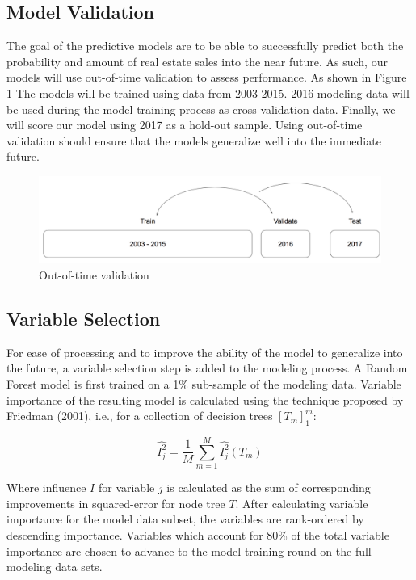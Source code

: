 \documentclass[12pt,]{article}
\begin{document}
\hypertarget{model-validation}{%
\subsection{Model Validation}\label{model-validation}}

The goal of the predictive models are to be able to successfully predict
both the probability and amount of real estate sales into the near
future. As such, our models will use out-of-time validation to assess
performance. As shown in Figure \ref{fig:Train Test Validate} The models
will be trained using data from 2003-2015. 2016 modeling data will be
used during the model training process as cross-validation data.
Finally, we will score our model using 2017 as a hold-out sample. Using
out-of-time validation should ensure that the models generalize well
into the immediate future.

\begin{figure}[h]
\includegraphics[width=1\linewidth]{Sections/tables and figures/Train Validate Test} \caption{Out-of-time validation}\label{fig:Train Test Validate}
\end{figure}

\hypertarget{variable-selection}{%
\subsection{Variable Selection}\label{variable-selection}}

For ease of processing and to improve the ability of the model to
generalize into the future, a variable selection step is added to the
modeling process. A Random Forest model is first trained on a 1\%
sub-sample of the modeling data. Variable importance of the resulting
model is calculated using the technique proposed by Friedman (2001),
i.e., for a collection of decision trees \([T_m]_{1}^{m}\):

\[
  \hat{I_{j}^{2}} = \frac{1}{M} \sum_{m=1}^{M}\hat{I_{j}^{2}}(T_m)
\]

Where influence \(I\) for variable \(j\) is calculated as the sum of
corresponding improvements in squared-error for node tree \(T\). After
calculating variable importance for the model data subset, the variables
are rank-ordered by descending importance. Variables which account for
80\% of the total variable importance are chosen to advance to the model
training round on the full modeling data sets.
\end{document}

